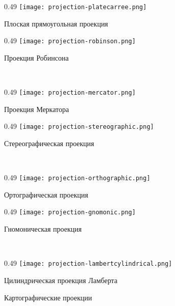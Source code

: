 \begin{figure}[p]
    \centering
    \begin{subcaptionblock}[b]{0.49\tw}
        \centering
        \texttt{[image: projection-platecarree.png]}
        \caption{Плоская прямоугольная проекция}
        \label{pic:map-projection-plate-carree}
    \end{subcaptionblock}
    \hfill
    \begin{subcaptionblock}[b]{0.49\tw}
        \centering
        \texttt{[image: projection-robinson.png]}
        \caption{Проекция Робинсона}
        \label{pic:map-projection-plate-robinson}
    \end{subcaptionblock}
    \\
    \begin{subcaptionblock}[b]{0.49\tw}
        \centering
        \texttt{[image: projection-mercator.png]}
        \caption{Проекция Меркатора}
        \label{pic:map-projection-mercator}
    \end{subcaptionblock}
    \hfill
    \begin{subcaptionblock}[b]{0.49\tw}
        \centering
        \texttt{[image: projection-stereographic.png]}
        \caption{Стереографическая проекция}
        \label{pic:map-projection-stereographic}
    \end{subcaptionblock}
    \\
    \begin{subcaptionblock}[b]{0.49\tw}
        \centering
        \texttt{[image: projection-orthographic.png]}
        \caption{Ортографическая проекция}
        \label{pic:map-projection-orthographic}
    \end{subcaptionblock}
    \hfill
    \begin{subcaptionblock}[b]{0.49\tw}
        \centering
        \texttt{[image: projection-gnomonic.png]}
        \caption{Гномоническая проекция}
        \label{pic:map-projection-gnomonic}
    \end{subcaptionblock}
    \\
    \begin{subcaptionblock}[b]{0.49\tw}
        \centering
        \texttt{[image: projection-lambertcylindrical.png]}
        \caption{Цилиндрическая проекция Ламберта}
        \label{pic:map-projection-lambertcylindrical}
    \end{subcaptionblock}
    \caption{Картографические проекции}
    \label{pic:map-projection}
\end{figure}
